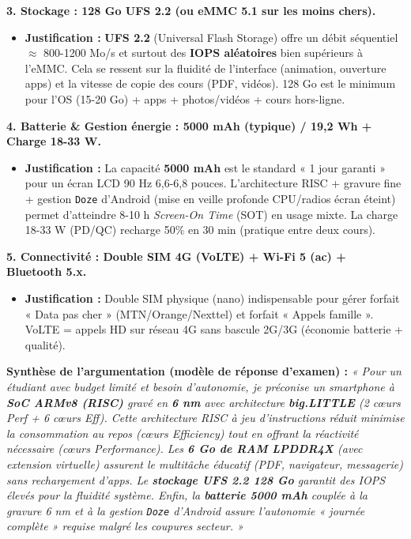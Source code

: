 \documentclass[11pt]{article}
\begin{document}
\begin{exoresolu}
\textbf{3. Stockage : 128 Go UFS 2.2 (ou eMMC 5.1 sur les moins chers).}
\begin{itemize}
    \item \textbf{Justification :} \textbf{UFS 2.2} (Universal Flash Storage) offre un débit séquentiel $\approx$ 800-1200 Mo/s et surtout des \textbf{IOPS aléatoires} bien supérieurs à l'eMMC. Cela se ressent sur la fluidité de l'interface (animation, ouverture apps) et la vitesse de copie des cours (PDF, vidéos). 128 Go est le minimum pour l'OS (15-20 Go) + apps + photos/vidéos + cours hors-ligne.
\end{itemize}

\textbf{4. Batterie \& Gestion énergie : 5000 mAh (typique) / 19,2 Wh + Charge 18-33 W.}
\begin{itemize}
    \item \textbf{Justification :} La capacité \textbf{5000 mAh} est le standard « 1 jour garanti » pour un écran LCD 90 Hz 6,6-6,8 pouces. L'architecture RISC + gravure fine + gestion \texttt{Doze} d'Android (mise en veille profonde CPU/radios écran éteint) permet d'atteindre 8-10 h \emph{Screen-On Time} (SOT) en usage mixte. La charge 18-33 W (PD/QC) recharge 50\% en 30 min (pratique entre deux cours).
\end{itemize}

\textbf{5. Connectivité : Double SIM 4G (VoLTE) + Wi-Fi 5 (ac) + Bluetooth 5.x.}
\begin{itemize}
    \item \textbf{Justification :} Double SIM physique (nano) indispensable pour gérer forfait « Data pas cher » (MTN/Orange/Nexttel) et forfait « Appels famille ». VoLTE = appels HD sur réseau 4G sans bascule 2G/3G (économie batterie + qualité).
\end{itemize}

\textbf{Synthèse de l'argumentation (modèle de réponse d'examen) :}
\emph{« Pour un étudiant avec budget limité et besoin d'autonomie, je préconise un smartphone à \textbf{SoC ARMv8 (RISC)} gravé en \textbf{6 nm} avec architecture \textbf{big.LITTLE} (2 cœurs Perf + 6 cœurs Eff). Cette architecture RISC à jeu d'instructions réduit minimise la consommation au repos (cœurs Efficiency) tout en offrant la réactivité nécessaire (cœurs Performance). Les \textbf{6 Go de RAM LPDDR4X} (avec extension virtuelle) assurent le multitâche éducatif (PDF, navigateur, messagerie) sans rechargement d'apps. Le \textbf{stockage UFS 2.2 128 Go} garantit des IOPS élevés pour la fluidité système. Enfin, la \textbf{batterie 5000 mAh} couplée à la gravure 6 nm et à la gestion \texttt{Doze} d'Android assure l'autonomie « journée complète » requise malgré les coupures secteur. »}
\end{exoresolu}
\end{document}
